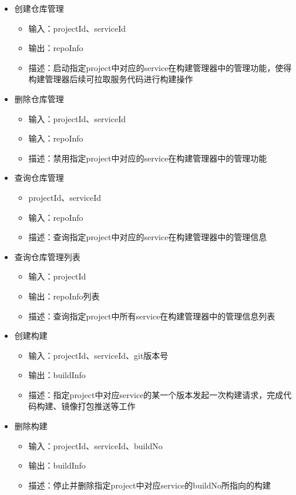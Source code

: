 \documentclass[a4paper, 12pt]{article}
\theoremstyle{definition}
\begin{document}
\begin{itemize}
	\item{创建仓库管理
		\begin{itemize}
		\item 输入：projectId、serviceId
		\item 输出：repoInfo
		\item 描述：启动指定project中对应的service在构建管理器中的管理功能，使得构建管理器后续可拉取服务代码进行构建操作
		\end{itemize}}
	\item{删除仓库管理
		\begin{itemize}
		\item 输入：projectId、serviceId
		\item 输入：repoInfo
		\item 描述：禁用指定project中对应的service在构建管理器中的管理功能
		\end{itemize}}
	\item{查询仓库管理
		\begin{itemize}
		\item projectId、serviceId
		\item 输入：repoInfo
		\item 描述：查询指定project中对应的service在构建管理器中的管理信息
		\end{itemize}}
	\item{查询仓库管理列表
		\begin{itemize}
		\item 输入：projectId
		\item 输出：repoInfo列表
		\item 描述：查询指定project中所有service在构建管理器中的管理信息列表
		\end{itemize}}
	\item{创建构建
		\begin{itemize}
		\item 输入：projectId、serviceId、git版本号
		\item 输出：buildInfo
		\item 描述：指定project中对应service的某一个版本发起一次构建请求，完成代码构建、镜像打包推送等工作
		\end{itemize}}
	\item{删除构建
		\begin{itemize}
		\item 输入：projectId、serviceId、buildNo
		\item 输出：buildInfo
		\item 描述：停止并删除指定project中对应service的buildNo所指向的构建

\end{itemize}}
\end{itemize}
\end{document}
